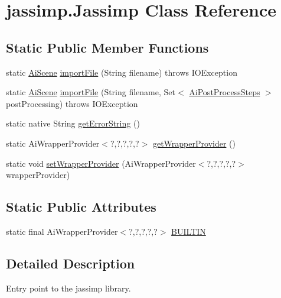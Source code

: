 \hypertarget{classjassimp_1_1_jassimp}{\section{jassimp.\+Jassimp Class Reference}
\label{classjassimp_1_1_jassimp}
}
\subsection*{Static Public Member Functions}
\begin{DoxyCompactItemize}
\item 
static \hyperlink{classjassimp_1_1_ai_scene}{Ai\+Scene} \hyperlink{classjassimp_1_1_jassimp_ad633a3ba0ba16bb1d78aac00c0de8ccc}{import\+File} (String filename)  throws I\+O\+Exception 
\item 
static \hyperlink{classjassimp_1_1_ai_scene}{Ai\+Scene} \hyperlink{classjassimp_1_1_jassimp_a0027b306e2347ef392629b4825d81e9a}{import\+File} (String filename, Set$<$ \hyperlink{enumjassimp_1_1_ai_post_process_steps}{Ai\+Post\+Process\+Steps} $>$ post\+Processing)  throws I\+O\+Exception 
\item 
static native String \hyperlink{classjassimp_1_1_jassimp_a28dad3b44f39bad46d4f7417351fcd28}{get\+Error\+String} ()
\item 
static Ai\+Wrapper\+Provider$<$?,?,?,?,?$>$ \hyperlink{classjassimp_1_1_jassimp_a7715a96b604554c25befe0d1404da374}{get\+Wrapper\+Provider} ()
\item 
static void \hyperlink{classjassimp_1_1_jassimp_a8f8b958eeeaf2c9b396ea5812fd58f62}{set\+Wrapper\+Provider} (Ai\+Wrapper\+Provider$<$?,?,?,?,?$>$ wrapper\+Provider)
\end{DoxyCompactItemize}
\subsection*{Static Public Attributes}
\begin{DoxyCompactItemize}
\item 
static final Ai\+Wrapper\+Provider$<$?,?,?,?,?$>$ \hyperlink{classjassimp_1_1_jassimp_a4b5a9a1f13f2397a63d7630d80e5e3a2}{B\+U\+I\+L\+T\+I\+N}
\end{DoxyCompactItemize}


\subsection{Detailed Description}
Entry point to the jassimp library.

